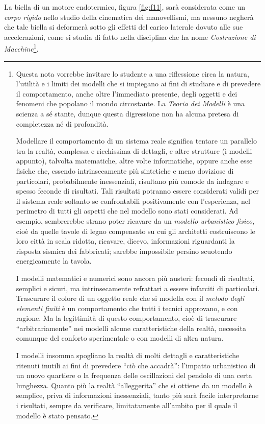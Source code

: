 La biella di un motore endotermico, figura \ref{fig:f11}, sar\`a considerata come un
{\em corpo rigido} nello studio della cinematica dei manovellismi, ma 
nessuno negher\`a che tale biella si deformer\`a sotto gli effetti
del carico laterale dovuto alle sue accelerazioni,
come si studia di fatto
nella disciplina che ha nome {\em Costruzione di Macchine}\footnote{
Questa nota vorrebbe
invitare lo studente a una riflessione circa la natura, 
l'utilit\`a e i limiti dei modelli che si impiegano ai fini di studiare
e di prevedere il comportamento, anche oltre l'immediato
presente, degli oggetti e dei fenomeni
che popolano il mondo circostante. La {\em Teoria dei Modelli}
\`e una scienza a s\'e stante, dunque questa digressione
non ha alcuna pretesa
di completezza n\'e di profondit\`a.

\noindent Modellare il comportamento di un sistema reale
significa tentare un parallelo tra la realt\`a, complessa e 
ricchissima di dettagli, e altre strutture (i modelli appunto), talvolta
matematiche, altre
volte informatiche, oppure anche esse fisiche che, 
essendo intrinsecamente pi\`u sintetiche e meno doviziose di particolari,
probabilmente inessenziali,
risultano pi\`u comode da indagare e spesso feconde di risultati.
Tali risultati potranno essere considerati validi per il sistema reale soltanto
se confrontabili positivamente
con l'esperienza, nel perimetro
di tutti gli aspetti che nel modello sono stati considerati.
Ad esempio, sembrerebbe strano poter ricavare da un {\em modello urbanistico
fisico},
cio\`e da quelle tavole di legno compensato su cui gli architetti costruiscono
le loro citt\`a in scala ridotta, ricavare, dicevo, informazioni riguardanti
la risposta sismica dei fabbricati; sarebbe impossibile persino scuotendo
energicamente la tavola.

\noindent I modelli matematici e numerici sono ancora pi\`u austeri: fecondi di risultati, semplici
e sicuri, ma intrinsecamente refrattari a essere infarciti di particolari.
Trascurare il colore di un oggetto reale che si modella con il {\em metodo
degli elementi finiti} \`e un comportamento che tutti i tecnici 
approvano, e con ragione. Ma la legittimit\`a di questo comportamento, cio\`e
di trascurare ``arbitrariamente'' nei modelli alcune caratteristiche della
realt\`a, necessita comunque del conforto sperimentale o con modelli di altra
natura.

\noindent I modelli insomma spogliano la realt\`a di molti dettagli e caratteristiche
ritenuti inutili ai fini di prevedere ``ci\`o che accadr\`a'': 
l'impatto urbanistico di un nuovo quartiere o la frequenza delle
oscillazioni del pendolo di una certa lunghezza.
Quanto pi\`u
la realt\`a ``alleggerita'' che si ottiene da un modello
\`e semplice, priva di 
informazioni inessenziali, tanto pi\`u sar\`a
facile interpretarne i risultati,
sempre da verificare, limitatamente all'ambito per il quale il modello \`e stato pensato.
}.

